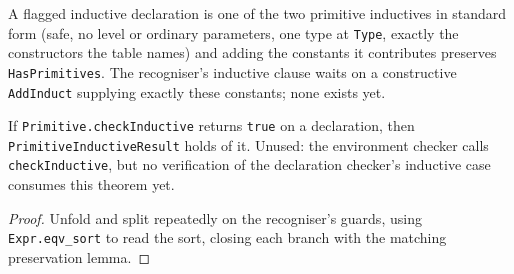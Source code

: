 \begin{definition}
\label{vpc:def:primitive-inductive-result}\leanok
{}

 A flagged inductive declaration is one of the two primitive inductives in
standard form (safe, no level or ordinary parameters, one type at \texttt{Type}, exactly the
constructors the table names) and adding the constants it contributes preserves
\texttt{HasPrimitives}.
 The recogniser's inductive clause waits on a constructive
\texttt{AddInduct} supplying exactly these constants; none exists yet.
\end{definition}

\begin{lemma}
\label{vpc:thm:checkinductive-wf}\leanok
{}

 If \texttt{Primitive.checkInductive} returns \texttt{true} on a declaration, then
\texttt{PrimitiveInductiveResult} holds of it.
 Unused: the environment checker calls \texttt{checkInductive}, but no
verification of the declaration checker's inductive case consumes this theorem yet.
\end{lemma}
\begin{proof}\leanok
{}
 Unfold and split repeatedly on the recogniser's guards, using
\texttt{Expr.eqv\_sort} to read the sort, closing each branch with the matching preservation
lemma.
\end{proof}

